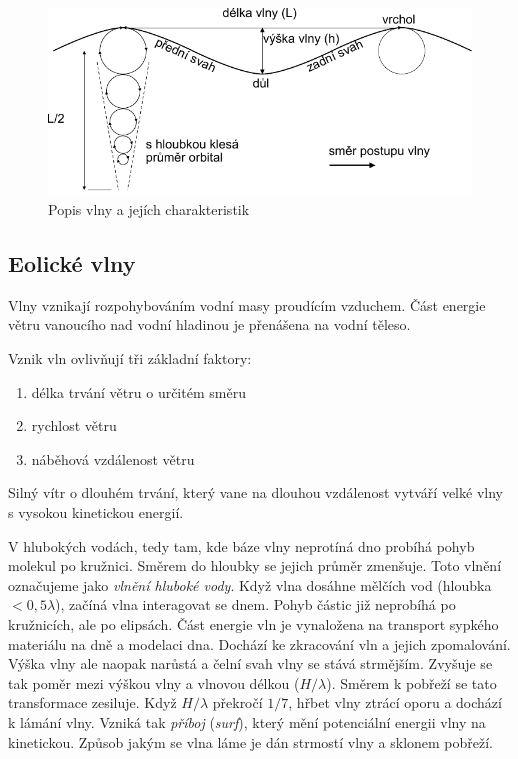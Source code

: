 \begin{figure}[h]
	\centering
	\includegraphics[width=0.8\linewidth]{obrazky/marine/vlny}
	\caption{Popis vlny a jejích charakteristik}
	\label{fig:vlny}
\end{figure}



\subsection{Eolické vlny}
Vlny vznikají rozpohybováním vodní masy proudícím vzduchem. Část energie větru vanoucího nad vodní hladinou je přenášena na vodní těleso. 

Vznik vln ovlivňují tři základní faktory:
\begin{enumerate}
	\item délka trvání větru o určitém směru
	\item rychlost větru
	\item náběhová vzdálenost větru
\end{enumerate}

Silný vítr o dlouhém trvání, který vane na dlouhou vzdálenost vytváří velké vlny s vysokou kinetickou energií. 

V hlubokých vodách, tedy tam, kde báze vlny neprotíná dno probíhá pohyb molekul po kružnici. Směrem do hloubky se jejich průměr zmenšuje. Toto vlnění označujeme jako \emph{vlnění hluboké vody}. Když vlna dosáhne mělčích vod (hloubka $< 0,5\lambda$), začíná vlna interagovat se dnem. Pohyb částic již neprobíhá po kružnicích, ale po elipsách. Část energie vln je vynaložena na transport sypkého materiálu na dně a modelaci dna. Dochází ke zkracování vln a jejich zpomalování. Výška vlny ale naopak narůstá a čelní svah vlny se stává strmějším. Zvyšuje se tak poměr mezi výškou vlny a vlnovou délkou ($H/\lambda$). Směrem k pobřeží se tato transformace zesiluje. Když $H/\lambda$ překročí $1/7$, hřbet vlny ztrácí oporu a dochází k lámání vlny. Vzniká tak \emph{příboj} (\textit{surf}), který mění potenciální energii vlny na kinetickou. Způsob jakým se vlna láme je dán strmostí vlny a sklonem pobřeží.

